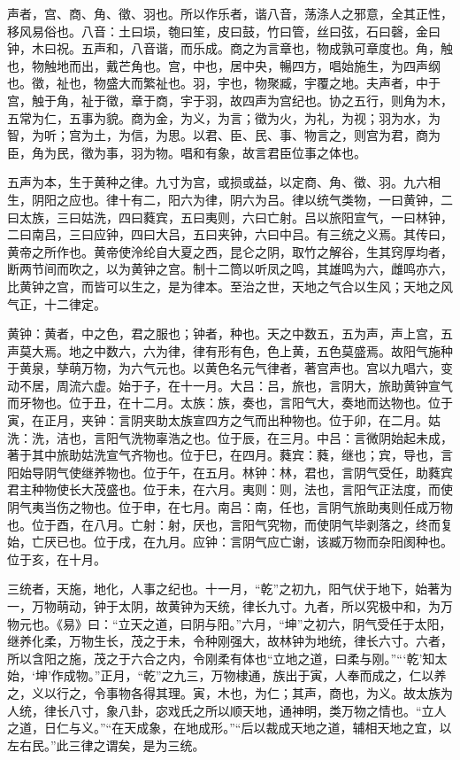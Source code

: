 \documentclass[12pt,UTF8]{ctexbook}
\begin{document}
声者，宫、商、角、徵、羽也。所以作乐者，谐八音，荡涤人之邪意，全其正性，移风易俗也。八音：土曰埙，匏曰笙，皮曰鼓，竹曰管，丝曰弦，石曰磬，金曰钟，木曰祝。五声和，八音谐，而乐成。商之为言章也，物成孰可章度也。角，触也，物触地而出，戴芒角也。宫，中也，居中央，暢四方，唱始施生，为四声纲也。徵，祉也，物盛大而繁祉也。羽，宇也，物聚臧，宇覆之地。夫声者，中于宫，触于角，祉于徵，章于商，宇于羽，故四声为宫纪也。协之五行，则角为木，五常为仁，五事为貌。商为金，为义，为言；徵为火，为礼，为视；羽为水，为智，为听；宫为土，为信，为思。以君、臣、民、事、物言之，则宫为君，商为臣，角为民，徵为事，羽为物。唱和有象，故言君臣位事之体也。



五声为本，生于黄种之律。九寸为宫，或损或益，以定商、角、徵、羽。九六相生，阴阳之应也。律十有二，阳六为律，阴六为吕。律以统气类物，一曰黄钟，二曰太族，三曰姑洗，四曰蕤宾，五曰夷则，六曰亡射。吕以旅阳宣气，一曰林钟，二曰南吕，三曰应钟，四曰大吕，五曰夹钟，六曰中吕。有三统之义焉。其传曰，黄帝之所作也。黄帝使泠纶自大夏之西，昆仑之阴，取竹之解谷，生其窍厚均者，断两节间而吹之，以为黄钟之宫。制十二筒以听凤之鸣，其雄鸣为六，雌鸣亦六，比黄钟之宫，而皆可以生之，是为律本。至治之世，天地之气合以生风；天地之风气正，十二律定。



黄钟：黄者，中之色，君之服也；钟者，种也。天之中数五，五为声，声上宫，五声莫大焉。地之中数六，六为律，律有形有色，色上黄，五色莫盛焉。故阳气施种于黄泉，孳萌万物，为六气元也。以黄色名元气律者，著宫声也。宫以九唱六，变动不居，周流六虚。始于子，在十一月。大吕：吕，旅也，言阴大，旅助黄钟宣气而牙物也。位于丑，在十二月。太族：族，奏也，言阳气大，奏地而达物也。位于寅，在正月，夹钟：言阴夹助太族宣四方之气而出种物也。位于卯，在二月。姑洗：洗，洁也，言阳气洗物辜浩之也。位于辰，在三月。中吕：言微阴始起未成，著于其中旅助姑洗宣气齐物也。位于巳，在四月。蕤宾：蕤，继也；宾，导也，言阳始导阴气使继养物也。位于午，在五月。林钟：林，君也，言阴气受任，助蕤宾君主种物使长大茂盛也。位于未，在六月。夷则：则，法也，言阳气正法度，而使阴气夷当伤之物也。位于申，在七月。南吕：南，任也，言阴气旅助夷则任成万物也。位于酉，在八月。亡射：射，厌也，言阳气究物，而使阴气毕剥落之，终而复始，亡厌已也。位于戌，在九月。应钟：言阴气应亡谢，该臧万物而杂阳阂种也。位于亥，在十月。



三统者，天施，地化，人事之纪也。十一月，“乾”之初九，阳气伏于地下，始著为一，万物萌动，钟于太阴，故黄钟为天统，律长九寸。九者，所以究极中和，为万物元也。《易》曰：“立天之道，曰阴与阳。”六月，“坤”之初六，阴气受任于太阳，继养化柔，万物生长，茂之于未，令种刚强大，故林钟为地统，律长六寸。六者，所以含阳之施，茂之于六合之内，令刚柔有体也“立地之道，曰柔与刚。”“‘乾’知太始，‘坤’作成物。”正月，“乾”之九三，万物棣通，族出于寅，人奉而成之，仁以养之，义以行之，令事物各得其理。寅，木也，为仁；其声，商也，为义。故太族为人统，律长八寸，象八卦，宓戏氏之所以顺天地，通神明，类万物之情也。“立人之道，日仁与义。”“在天成象，在地成形。”“后以裁成天地之道，辅相天地之宜，以左右民。”此三律之谓矣，是为三统。
\end{document}
